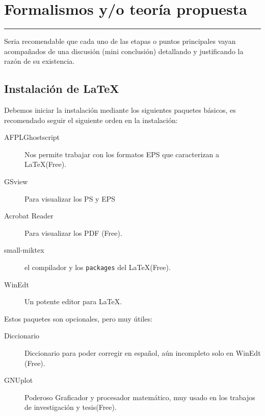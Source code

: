 \chapter{Formalismos y/o teoría propuesta}
\hrule \bigskip \vspace*{1cm}

Seria recomendable que cada uno de las etapas o puntos principales
vayan acompañados de una discusión (mini conclusión) detallando y
justificando la razón de su existencia.

\section{Instalación de \LaTeX}

Debemos iniciar la instalación mediante los siguientes paquetes
básicos, es recomendado seguir el siguiente orden en la
instalación:

\begin{description}
    \item[AFPLGhostscript] Nos permite trabajar con los formatos
    EPS que caracterizan a \LaTeX (Free).
    \item[GSview] Para visualizar los PS y EPS
    \item[Acrobat Reader] Para visualizar los PDF (Free).
    \item[small-miktex] el compilador y los \verb"packages" del
    \LaTeX (Free).
    \item[WinEdt] Un potente editor para \LaTeX.
\end{description}

Estos paquetes son opcionales, pero muy útiles:

\begin{description}
        \item[Diccionario] Diccionario para poder corregir en
    español, aún incompleto solo en WinEdt (Free).
     \item[GNUplot]Poderoso Graficador y procesador matemático, muy usado
     en los trabajos de investigación y tesis(Free).
\end{description}
